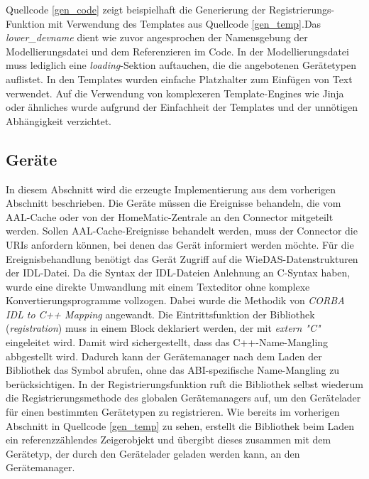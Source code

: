 Quellcode \ref{gen_code} zeigt beispielhaft die Generierung der Registrierungs-Funktion mit Verwendung
des Templates aus Quellcode \ref{gen_temp}.Das \emph{lower\_devname} dient wie zuvor angesprochen der Namensgebung der Modellierungsdatei und dem Referenzieren
im Code.
In der Modellierungsdatei muss lediglich eine \emph{loading}-Sektion auftauchen, die die angebotenen Gerätetypen
auflistet.
In den Templates wurden einfache Platzhalter zum Einfügen von Text verwendet.
Auf die Verwendung von komplexeren Template-Engines wie Jinja \cite{jinja} oder ähnliches wurde aufgrund der Einfachheit
der Templates und der unnötigen Abhängigkeit verzichtet.

\subsection{Geräte}
\label{imp_abb_geräte}

In diesem Abschnitt wird die erzeugte Implementierung aus dem vorherigen Abschnitt beschrieben.
Die Geräte müssen die Ereignisse behandeln, die vom AAL-Cache oder von der HomeMatic-Zentrale an den Connector
mitgeteilt werden.
Sollen AAL-Cache-Ereignisse behandelt werden, muss der Connector die URIs anfordern können, bei denen das Gerät
informiert werden möchte.
Für die Ereignisbehandlung benötigt das Gerät Zugriff auf die WieDAS-Datenstrukturen der IDL-Datei.
Da die Syntax der IDL-Dateien Anlehnung an C-Syntax haben, wurde eine direkte Umwandlung mit einem Texteditor
ohne komplexe Konvertierungsprogramme vollzogen.
Dabei wurde die Methodik von \emph{CORBA IDL to C++ Mapping} \cite{corba_cpp_map} angewandt.
Die Eintrittsfunktion der Bibliothek (\emph{registration}) muss in einem Block deklariert werden, der mit \emph{extern "C"} eingeleitet wird.
Damit wird sichergestellt, dass das C++-Name-Mangling abbgestellt wird.
Dadurch kann der Gerätemanager nach dem Laden der Bibliothek das Symbol abrufen, ohne das ABI-spezifische Name-Mangling
zu berücksichtigen.
In der Registrierungsfunktion ruft die Bibliothek selbst wiederum die Registrierungsmethode des globalen Gerätemanagers
auf, um den Gerätelader für einen bestimmten Gerätetypen zu registrieren.
Wie bereits im vorherigen Abschnitt in Quellcode \ref{gen_temp} zu sehen, erstellt die Bibliothek beim Laden ein
referenzzählendes Zeigerobjekt und übergibt dieses zusammen mit dem Gerätetyp, der durch den Gerätelader geladen werden kann,
an den Gerätemanager.

